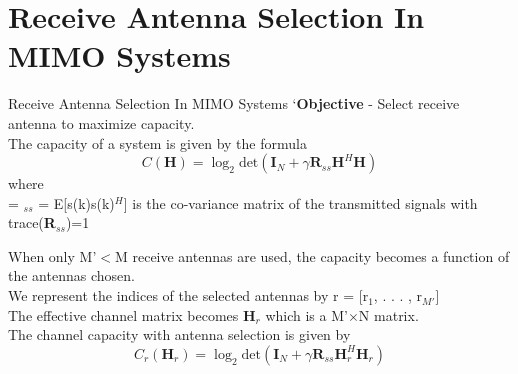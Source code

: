 \documentclass{beamer}
\begin{document}
\section{Receive Antenna Selection In MIMO Systems}
\begin{frame}{Receive Antenna Selection In MIMO Systems}
`\textbf{Objective} - Select receive antenna to maximize capacity.\\
The capacity of a system is given by the formula
\begin{equation*}
    C(\boldsymbol{H})=\log_{2}\text{det}(\boldsymbol{I}_{N} + \gamma\boldsymbol{R}_{ss}\boldsymbol{H}^{H}\boldsymbol{H})
\end{equation*}
where\\
\vskip 0.2in
\gamma = \textstyle{}
\newline
\newline
{}$_{ss}$ = E[s(k)s(k)$^H$] is the co-variance matrix of the transmitted signals with trace(\textbf{R}$_{ss}$)=1
\end{frame}

\begin{frame}{}
When only M'$<$M receive antennas are used, the capacity becomes a function of the antennas chosen.\\
\vskip 0.2in
We represent the indices of the selected antennas by r =
[r$_1$, . . . , r$_{M'}$]\\
\vskip 0.2in
The effective channel matrix becomes \textbf{H}$_r$ which is a M'$\times$N matrix.\\
\vskip 0.2in
The channel capacity with antenna selection is given by
\begin{equation*}
    C_r(\boldsymbol{H}_r) = \log_{2}\text{det}(\boldsymbol{I}_{N} + \gamma\boldsymbol{R}_{ss}\boldsymbol{H}_{r}^{H}\boldsymbol{H}_{r})
\end{equation*}
\end{frame}
\end{document}
